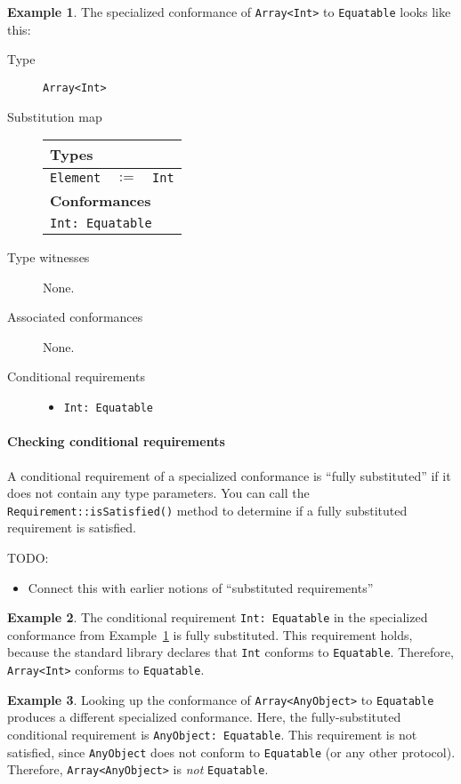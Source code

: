 \documentclass[a4paper,headsepline,bibliography=totoc,toc=flat,fleqn,twoside=semi]{scrbook}
\theoremstyle{definition}
\theoremstyle{definition}
\newtheorem{example}{Example}[chapter]
\theoremstyle{definition}
\newcommand{\SubMapC}[2]{\begin{tabular}{|lll|}
\hline
\multicolumn{3}{|l|}{\textbf{Types}}\\
\hline
#1\\
\hline
\hline
\multicolumn{3}{|l|}{\textbf{Conformances}}\\
\hline
#2\\
\hline
\end{tabular}}
\newcommand{\SubType}[2]{\texttt{#1}&$:=$&\texttt{#2}}
\newcommand{\SubConf}[1]{\multicolumn{3}{|l|}{\texttt{#1}}}
\begin{document}
\begin{example}\label{arrayintequatable}
The specialized conformance of \texttt{Array<Int>} to \texttt{Equatable} looks like this:
\begin{description}
\item[Type] \texttt{Array<Int>}

\item[Substitution map] \phantom{a}

\SubMapC{
\SubType{Element}{Int}
}{
\SubConf{Int:\ Equatable}
}

\item[Type witnesses] None.

\item[Associated conformances] None.

\item[Conditional requirements] \phantom{a}

\begin{itemize}
\item \texttt{Int:\ Equatable}
\end{itemize}
\end{description}
\end{example}

\paragraph{Checking conditional requirements}
A conditional requirement of a specialized conformance is ``fully substituted'' if it does not contain any type parameters. You can call the \texttt{Requirement::isSatisfied()} method to determine if a fully substituted requirement is satisfied.

TODO:
\begin{itemize}
\item Connect this with earlier notions of ``substituted requirements''
\end{itemize}

\begin{example}
The conditional requirement \texttt{Int:\ Equatable} in the specialized conformance from Example~\ref{arrayintequatable} is fully substituted. This requirement holds, because the standard library declares that \texttt{Int} conforms to \texttt{Equatable}. Therefore, \texttt{Array<Int>} conforms to \texttt{Equatable}.
\end{example}

\begin{example}
Looking up the conformance of \texttt{Array<AnyObject>} to \texttt{Equatable} produces a different specialized conformance. Here, the fully-substituted conditional requirement is \texttt{AnyObject:\ Equatable}. This requirement is not satisfied, since \texttt{AnyObject} does not conform to \texttt{Equatable} (or any other protocol). Therefore, \texttt{Array<AnyObject>} is \emph{not} \texttt{Equatable}.
\end{example}
\end{document}
